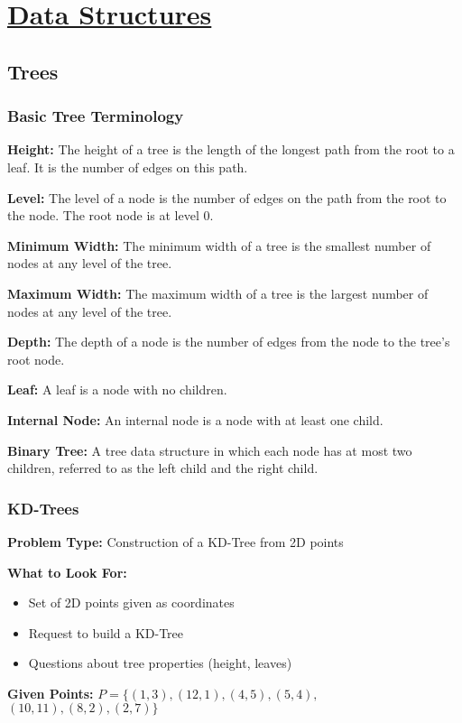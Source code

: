 \clearpage
\section{\texorpdfstring{\underline{Data Structures}}{Data Structures}}
\subsection{Trees}
\subsubsection{Basic Tree Terminology}
\textbf{Height:} The height of a tree is the length of the longest path from the root to a leaf. It is the number of edges on this path.

\textbf{Level:} The level of a node is the number of edges on the path from the root to the node. The root node is at level 0.

\textbf{Minimum Width:} The minimum width of a tree is the smallest number of nodes at any level of the tree.

\textbf{Maximum Width:} The maximum width of a tree is the largest number of nodes at any level of the tree.

\textbf{Depth:} The depth of a node is the number of edges from the node to the tree's root node.

\textbf{Leaf:} A leaf is a node with no children.

\textbf{Internal Node:} An internal node is a node with at least one child.

\textbf{Binary Tree:} A tree data structure in which each node has at most two children, referred to as the left child and the right child.

\subsubsection{KD-Trees}
\textbf{Problem Type:} Construction of a KD-Tree from 2D points

\textbf{What to Look For:}
\begin{itemize}[noitemsep,leftmargin=*]
    \item Set of 2D points given as coordinates
    \item Request to build a KD-Tree
    \item Questions about tree properties (height, leaves)
\end{itemize}

\textbf{Given Points:} 
$P = \{(1,3), (12,1), (4,5), (5,4),$ \\
\hspace*{1cm} $(10,11), (8,2), (2,7)\}$

